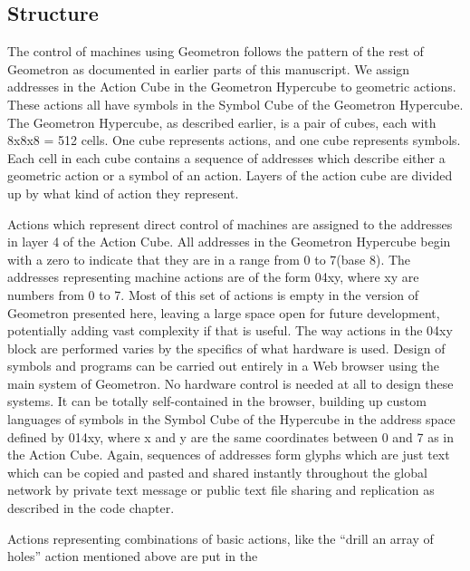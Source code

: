 \subsection{Structure}

The control of machines using Geometron follows the pattern of the rest of Geometron as documented in earlier parts of this manuscript.  We assign addresses in the Action Cube in the Geometron Hypercube to geometric actions.  These actions all have symbols in the Symbol Cube of the Geometron Hypercube.  The Geometron Hypercube, as described earlier, is a pair of cubes, each with 8x8x8 = 512 cells.  One cube represents actions, and one cube represents symbols.  Each cell in each cube contains a sequence of addresses which describe either a geometric action or a symbol of an action.  Layers of the action cube are divided up by what kind of action they represent.  

Actions which represent direct control of machines are assigned to the addresses in layer 4 of the Action Cube.  All addresses in the Geometron Hypercube begin with a zero to indicate that they are in a range from 0 to 7(base 8).  The addresses representing machine actions are of the form 04xy, where xy are numbers from 0 to 7.  Most of this set of actions is empty in the version of Geometron presented here, leaving a large space open for future development, potentially adding vast complexity if that is useful.  The way actions in the 04xy block are performed varies by the specifics of what hardware is used.  Design of symbols and programs can be carried out entirely in a Web browser using the main system of Geometron.  No hardware control is needed at all to design these systems.  It can be totally self-contained in the browser, building up custom languages of symbols in the Symbol Cube of the Hypercube in the address space defined by 014xy, where x and y are the same coordinates between 0 and 7 as in the Action Cube.  Again, sequences of addresses form glyphs which are just text which can be copied and pasted and shared instantly throughout the global network by private text message or public text file sharing and replication as described in the code chapter.

Actions representing combinations of basic actions, like the ``drill an array of holes'' action mentioned above are put in the 


